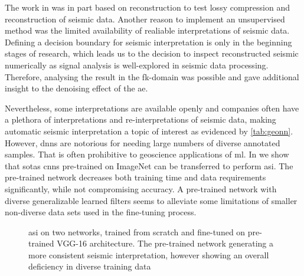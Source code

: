 The work in  \citep{dramsch2019complex} was in part based on reconstruction to test lossy compression and reconstruction of seismic data. Another reason to implement an unsupervised method was the limited availability of realiable interpretations of seismic data. Defining a decision boundary for seismic interpretation is only in the beginning stages of research, which leads us to the decision to inspect reconstructed seismic numerically as signal analysis is well-explored in seismic data processing. Therefore, analysing the result in the \ac{fk}-domain was possible and gave additional insight to the denoising effect of the \ac{ae}.

Nevertheless, some interpretations are available openly and companies often have a plethora of interpretations and re-interpretations of seismic data, making automatic seismic interpretation a topic of interest as evidenced by \cref{tab:geonn}. However, \aclp{dnn} are notorious for needing large numbers of diverse annotated samples. That is often prohibitive to geoscience applications of \acl{ml}. In  \citep{dramsch2018deep} we show that \aclp{sota} \aclp{cnn} pre-trained on ImageNet can be transferred to perform \acl{asi}. The pre-trained network decreases both training time and data requirements significantly, while not compromising accuracy. A pre-trained network with diverse generalizable learned filters seems to alleviate some limitations of smaller non-diverse data sets used in the fine-tuning process.

\begin{figure}[!ht]
\caption{\acl{asi} on two networks, trained from scratch and fine-tuned on pre-trained VGG-16 architecture. The pre-trained network generating a more consistent seismic interpretation, however showing an overall deficiency in diverse training data \citep[from][]{dramsch2018deep}}
\label{fig:asi}
\end{figure}

